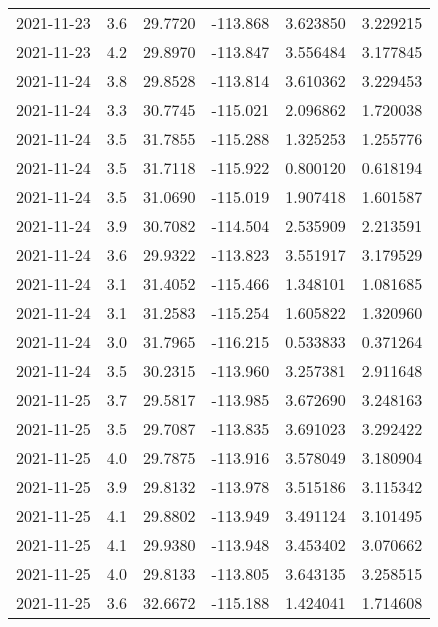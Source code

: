 \begin{tabular}{lrrrrr}
2021-11-23 &       3.6 &  29.7720 &  -113.868 &         3.623850 &         3.229215 \\
2021-11-23 &       4.2 &  29.8970 &  -113.847 &         3.556484 &         3.177845 \\
2021-11-24 &       3.8 &  29.8528 &  -113.814 &         3.610362 &         3.229453 \\
2021-11-24 &       3.3 &  30.7745 &  -115.021 &         2.096862 &         1.720038 \\
2021-11-24 &       3.5 &  31.7855 &  -115.288 &         1.325253 &         1.255776 \\
2021-11-24 &       3.5 &  31.7118 &  -115.922 &         0.800120 &         0.618194 \\
2021-11-24 &       3.5 &  31.0690 &  -115.019 &         1.907418 &         1.601587 \\
2021-11-24 &       3.9 &  30.7082 &  -114.504 &         2.535909 &         2.213591 \\
2021-11-24 &       3.6 &  29.9322 &  -113.823 &         3.551917 &         3.179529 \\
2021-11-24 &       3.1 &  31.4052 &  -115.466 &         1.348101 &         1.081685 \\
2021-11-24 &       3.1 &  31.2583 &  -115.254 &         1.605822 &         1.320960 \\
2021-11-24 &       3.0 &  31.7965 &  -116.215 &         0.533833 &         0.371264 \\
2021-11-24 &       3.5 &  30.2315 &  -113.960 &         3.257381 &         2.911648 \\
2021-11-25 &       3.7 &  29.5817 &  -113.985 &         3.672690 &         3.248163 \\
2021-11-25 &       3.5 &  29.7087 &  -113.835 &         3.691023 &         3.292422 \\
2021-11-25 &       4.0 &  29.7875 &  -113.916 &         3.578049 &         3.180904 \\
2021-11-25 &       3.9 &  29.8132 &  -113.978 &         3.515186 &         3.115342 \\
2021-11-25 &       4.1 &  29.8802 &  -113.949 &         3.491124 &         3.101495 \\
2021-11-25 &       4.1 &  29.9380 &  -113.948 &         3.453402 &         3.070662 \\
2021-11-25 &       4.0 &  29.8133 &  -113.805 &         3.643135 &         3.258515 \\
2021-11-25 &       3.6 &  32.6672 &  -115.188 &         1.424041 &         1.714608 \\

\end{tabular}
